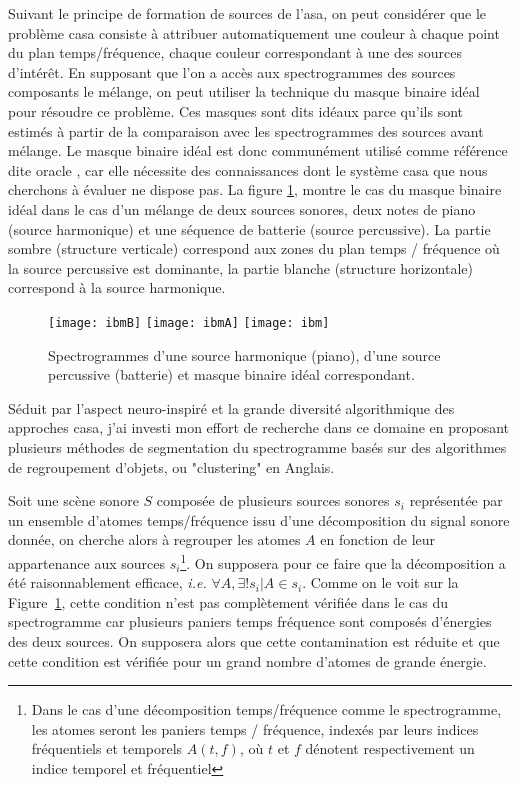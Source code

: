 
Suivant le principe de formation de sources de l'asa, on peut considérer que le problème casa consiste à attribuer automatiquement une couleur à chaque point du plan temps/fréquence, chaque couleur correspondant à une des sources d'intérêt. En supposant que l'on a accès aux spectrogrammes des sources composants le mélange, on peut utiliser la technique du masque binaire idéal pour résoudre ce problème. Ces masques sont dits idéaux parce qu'ils sont estimés à partir de la comparaison avec les spectrogrammes des sources avant mélange. Le masque binaire idéal est donc communément utilisé comme référence dite \og oracle \fg, car elle nécessite des connaissances dont le système casa que nous cherchons à évaluer ne dispose pas. La figure \ref{fig:ibm}, montre le cas du masque binaire idéal dans le cas d'un mélange de deux sources sonores, deux notes de piano (source harmonique) et une séquence de batterie (source percussive). La partie sombre (structure verticale) correspond aux zones du plan temps / fréquence où la source percussive est dominante, la partie blanche (structure horizontale) correspond à la source harmonique.

\begin{figure}
  \texttt{[image: ibmB]}
  \texttt{[image: ibmA]}
  \texttt{[image: ibm]}
  \caption{Spectrogrammes d'une source harmonique (piano), d'une source percussive (batterie) et masque binaire idéal correspondant.} \label{fig:ibm}
\end{figure}


Séduit par l'aspect neuro-inspiré et la grande diversité algorithmique des approches casa, j'ai investi mon effort de recherche dans ce domaine en proposant plusieurs méthodes de segmentation du spectrogramme basés sur des algorithmes de regroupement d'objets, ou "clustering" en Anglais.

Soit une scène sonore $S$ composée de plusieurs sources sonores $s_i$ représentée par un ensemble d'atomes temps/fréquence issu d'une décomposition du signal sonore donnée, on cherche alors à regrouper les atomes $A$ en fonction de leur appartenance aux sources $s_i$\footnote{Dans le cas d'une décomposition temps/fréquence comme le spectrogramme, les atomes seront les paniers temps / fréquence, indexés par leurs indices fréquentiels et temporels $A(t, f)$, où $t$ et $f$ dénotent respectivement un indice temporel et fréquentiel}. On supposera pour ce faire que la décomposition a été raisonnablement efficace, \textit{i.e.} $\forall A, \exists ! s_i | A \in s_i$. Comme on le voit sur la Figure~\ref{fig:ibm}, cette condition n'est pas complètement vérifiée dans le cas du spectrogramme car plusieurs paniers temps fréquence sont composés d'énergies des deux sources. On supposera alors que cette contamination est réduite et que cette condition est vérifiée pour un grand nombre d'atomes de grande énergie.

